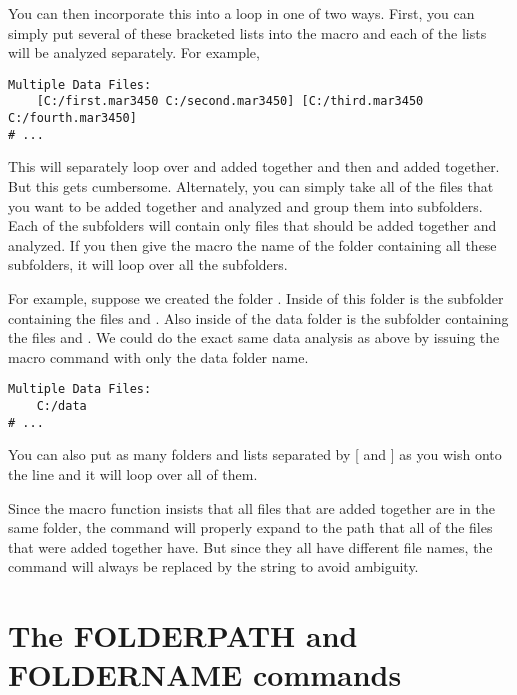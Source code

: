 You can then incorporate this into a loop in
one of two ways. First, you can simply put several
of these bracketed lists into the macro and each
of the lists will be analyzed separately. For example,
\begin{lstlisting}[caption={'Loop Over the Analysis'}]
Multiple Data Files:
    [C:/first.mar3450 C:/second.mar3450] [C:/third.mar3450 C:/fourth.mar3450]
# ...
\end{lstlisting}
This will separately loop over  
and  added together and then 
 and 
added together. But this gets cumbersome. Alternately,
you can simply take all of the files that you want to be 
added together and analyzed and group them into subfolders. 
Each of the subfolders will contain only files that should
be added together and analyzed. If you then give the
macro the name of the folder containing all these subfolders,
it will loop over all the subfolders. 

For example, suppose we created the folder .
Inside of this folder is the subfolder 
containing the files  and 
. Also inside of the data folder
is the subfolder  containing the files
 and .
We could do the exact same data analysis as above by 
issuing the macro command with only the data folder name.
\begin{lstlisting}[caption={'Using the Folder Syntax'}]
Multiple Data Files:
    C:/data
# ...
\end{lstlisting}
You can also put as many folders and lists separated
by [ and ] as you wish onto the line and it will loop
over all of them.

Since the macro function insists that all files 
that are added together are in the same folder,
the  command will properly expand 
to the path that all of the files that were added 
together have. But since they all have different file 
names, the  command will always be 
replaced by the string 
to avoid ambiguity.

\section{The FOLDERPATH and FOLDERNAME commands}

